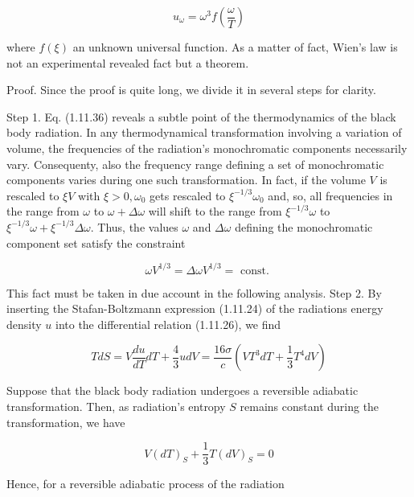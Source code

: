 \documentclass{article}
\begin{document}
\begin{equation*}
u_{\omega}=\omega^{3} f\left(\frac{\omega}{T}\right) \tag{1.11.37}
\end{equation*}
 
where $f(\xi)$ an unknown universal function. As a matter of fact, Wien's law is not an experimental revealed fact but a theorem.

Proof. Since the proof is quite long, we divide it in several steps for clarity.

Step 1. Eq. (1.11.36) reveals a subtle point of the thermodynamics of the black body radiation. In any thermodynamical transformation involving a variation of volume, the frequencies of the radiation's monochromatic components necessarily vary. Consequenty, also the frequency range defining a set of monochromatic components varies during one such transformation. In fact, if the volume $V$ is rescaled to $\xi V$ with $\xi>0, \omega_{0}$ gets rescaled to $\xi^{-1 / 3} \omega_{0}$ and, so, all frequencies in the range from $\omega$ to $\omega+\Delta \omega$ will shift to the range from $\xi^{-1 / 3} \omega$ to $\xi^{-1 / 3} \omega+\xi^{-1 / 3} \Delta \omega$. Thus, the values $\omega$ and $\Delta \omega$ defining the monochromatic component set satisfy the constraint
 
\begin{equation*}
\omega V^{1 / 3}=\Delta \omega V^{1 / 3}=\text { const. } \tag{1.11.38}
\end{equation*}
 

This fact must be taken in due account in the following analysis.
Step 2. By inserting the Stafan-Boltzmann expression (1.11.24) of the radiations energy density $u$ into the differential relation (1.11.26), we find
 
\begin{equation*}
T d S=V \frac{d u}{d T} d T+\frac{4}{3} u d V=\frac{16 \sigma}{c}\left(V T^{3} d T+\frac{1}{3} T^{4} d V\right) \tag{1.11.39}
\end{equation*}
 

Suppose that the black body radiation undergoes a reversible adiabatic transformation. Then, as radiation's entropy $S$ remains constant during the transformation, we have
 
\begin{equation*}
V(d T)_{S}+\frac{1}{3} T(d V)_{S}=0 \tag{1.11.40}
\end{equation*}
 

Hence, for a reversible adiabatic process of the radiation
 
\end{document}
